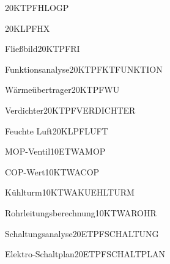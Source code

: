 \documentclass[bsz-mkk-exam,ka]{teacher}
\begin{document}

\begin{examaufgabe}[T]{\hlogpdia}{20}{KT}{PF}{HLOGP}
\end{examaufgabe}

\begin{examaufgabe}[T]{\hxdia}{20}{KL}{PF}{HX}
\end{examaufgabe}

\begin{examaufgabe}[T]{Fließbild}{20}{KT}{PF}{RI}
\end{examaufgabe}

\begin{examaufgabe}[T]{Funktionsanalyse}{20}{KT}{PF}{KTFUNKTION}
\end{examaufgabe}

\begin{examaufgabe}[T]{Wärmeübertrager}{20}{KT}{PF}{WU}
\end{examaufgabe}

\begin{examaufgabe}[T]{Verdichter}{20}{KT}{PF}{VERDICHTER}
\end{examaufgabe}

\begin{examaufgabe}[T]{Feuchte Luft}{20}{KL}{PF}{LUFT}
\end{examaufgabe}

\begin{examaufgabe}[T]{MOP-Ventil}{10}{ET}{WA}{MOP}
\end{examaufgabe}

\begin{examaufgabe}[T]{COP-Wert}{10}{KT}{WA}{COP}
\end{examaufgabe}

\begin{examaufgabe}[T]{Kühlturm}{10}{KT}{WA}{KUEHLTURM}
\end{examaufgabe}

\begin{examaufgabe}[T]{Rohrleitungsberechnung}{10}{KT}{WA}{ROHR}
\end{examaufgabe}

\begin{examaufgabe}[T]{Schaltungsanalyse}{20}{ET}{PF}{SCHALTUNG}
\end{examaufgabe}

\begin{examaufgabe}[T]{Elektro-Schaltplan}{20}{ET}{PF}{SCHALTPLAN}
\end{examaufgabe}
\end{document}
